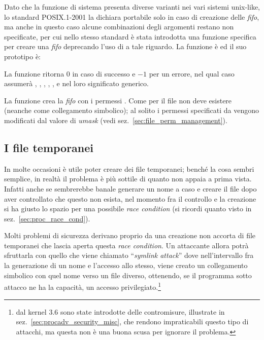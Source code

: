 
Dato che la funzione di sistema  presenta diverse varianti nei
vari sistemi unix-like, lo standard POSIX.1-2001 la dichiara portabile solo in
caso di creazione delle \textit{fifo}, ma anche in questo caso alcune
combinazioni degli argomenti restano non specificate, per cui nello stesso
standard è stata introdotta una funzione specifica per creare una
\textit{fifo} deprecando l'uso di  a tale riguardo.  La funzione è
 ed il suo prototipo è:

\begin{funcproto}{
}
{La funzione ritorna $0$ in caso di successo e $-1$ per un errore, nel qual
  caso  assumerà , ,
  , , ,  e
   nel loro significato generico.}
\end{funcproto}

La funzione crea la \textit{fifo}  con i
permessi . Come per  il file  non deve
esistere (neanche come collegamento simbolico); al solito i permessi
specificati da  vengono modificati dal valore di \textit{umask}
(vedi sez.~\ref{sec:file_perm_management}).



\subsection{I file temporanei}
\label{sec:file_temp_file}

In molte occasioni è utile poter creare dei file temporanei; benché la cosa
sembri semplice, in realtà il problema è più sottile di quanto non appaia a
prima vista. Infatti anche se sembrerebbe banale generare un nome a caso e
creare il file dopo aver controllato che questo non esista, nel momento fra il
controllo e la creazione si ha giusto lo spazio per una possibile \textit{race
  condition} (si ricordi quanto visto in sez.~\ref{sec:proc_race_cond}).


Molti problemi di sicurezza derivano proprio da una creazione non accorta di
file temporanei che lascia aperta questa \textit{race condition}. Un
attaccante allora potrà sfruttarla con quello che viene chiamato
``\textit{symlink attack}'' dove nell'intervallo fra la generazione di un nome
e l'accesso allo stesso, viene creato un collegamento simbolico con quel nome
verso un file diverso, ottenendo, se il programma sotto attacco ne ha la
capacità, un accesso privilegiato.\footnote{dal kernel 3.6 sono state
  introdotte delle contromisure, illustrate in
  sez.~\ref{sec:procadv_security_misc}, che rendono impraticabili questo tipo
  di attacchi, ma questa non è una buona scusa per ignorare il problema.}

